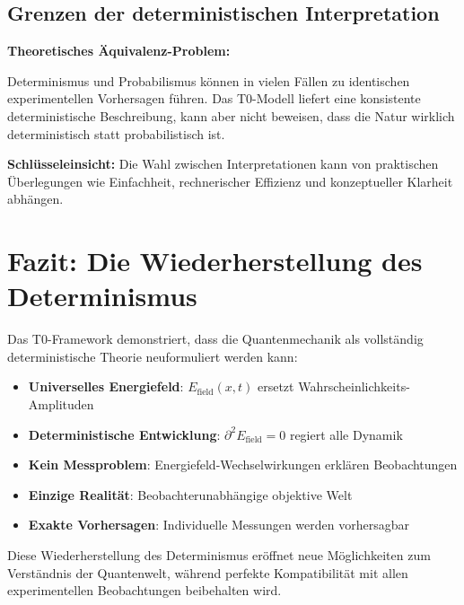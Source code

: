 \documentclass[12pt,a4paper]{report}
\begin{document}
	\subsection{Grenzen der deterministischen Interpretation}
	\label{subsec:limits_deterministic}
	
	\begin{tcolorbox}[colback=yellow!5!white,colframe=orange!75!black,title=Epistemologische Warnung]
		\textbf{Theoretisches Äquivalenz-Problem:}
		
		Determinismus und Probabilismus können in vielen Fällen zu identischen experimentellen Vorhersagen führen. Das T0-Modell liefert eine konsistente deterministische Beschreibung, kann aber nicht beweisen, dass die Natur wirklich deterministisch statt probabilistisch ist.
		
		\textbf{Schlüsseleinsicht:} Die Wahl zwischen Interpretationen kann von praktischen Überlegungen wie Einfachheit, rechnerischer Effizienz und konzeptueller Klarheit abhängen.
	\end{tcolorbox}
	
	\section{Fazit: Die Wiederherstellung des Determinismus}
	\label{sec:conclusion_determinism}
	
	Das T0-Framework demonstriert, dass die Quantenmechanik als vollständig deterministische Theorie neuformuliert werden kann:
	
	\begin{itemize}
		\item \textbf{Universelles Energiefeld}: $E_{\text{field}}(x,t)$ ersetzt Wahrscheinlichkeits-Amplituden
		\item \textbf{Deterministische Entwicklung}: $\partial^2 E_{\text{field}} = 0$ regiert alle Dynamik
		\item \textbf{Kein Messproblem}: Energiefeld-Wechselwirkungen erklären Beobachtungen
		\item \textbf{Einzige Realität}: Beobachterunabhängige objektive Welt
		\item \textbf{Exakte Vorhersagen}: Individuelle Messungen werden vorhersagbar
	\end{itemize}
	
	Diese Wiederherstellung des Determinismus eröffnet neue Möglichkeiten zum Verständnis der Quantenwelt, während perfekte Kompatibilität mit allen experimentellen Beobachtungen beibehalten wird.
	
\end{document}
